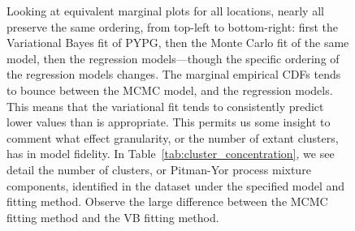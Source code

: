 \begin{figure}[ht]
Looking at equivalent marginal plots for all locations, nearly all preserve the
    same ordering, from top-left to bottom-right: first the Variational Bayes fit of PYPG, then the 
    Monte Carlo fit of the same model, then the regression models---though the specific ordering of
    the regression models changes.  The marginal empirical CDFs tends to bounce\makenote{[rephrase]}
    between the MCMC model, and the regression models.  This means that the variational fit
    tends to consistently predict lower values than is appropriate. This permits us some insight 
    to comment what effect granularity, or the number of extant clusters, has in model fidelity.
    In Table~\ref{tab:cluster_concentration}, we see detail the number of clusters, or Pitman-Yor
    process mixture components, identified in the dataset under the specified model and fitting 
    method.  Observe the large difference between the MCMC fitting method and the VB fitting
    method. 





\end{figure}
